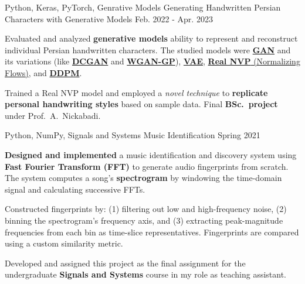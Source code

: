\begin{cventries}
  \cventry
    {Python, Keras, PyTorch, Genrative Models} %
    {Generating Handwritten Persian Characters with Generative Models} %
    {} %
    {Feb. 2022 - Apr. 2023} %
    {
      \begin{cvitems} %
      	\item {Evaluated and analyzed  \textbf{generative models} ability to represent and reconstruct individual Persian handwritten characters. The studied models were \href{https://arxiv.org/abs/1406.2661}{\textbf{GAN}} and its variations (like \href{https://arxiv.org/abs/1511.06434}{\textbf{DCGAN}} and \href{https://arxiv.org/abs/1704.00028}{\textbf{WGAN-GP}}), \href{https://arxiv.org/abs/1312.6114}{\textbf{VAE}}, \href{https://arxiv.org/abs/1605.08803}{\textbf{Real NVP} (Normalizing Flows)}, and \href{https://arxiv.org/abs/2006.11239}{\textbf{DDPM}}.}
      	\item{Trained a Real NVP model and employed a \textit{novel technique} to \textbf{replicate personal handwriting styles} based on sample data. Final \textbf{BSc.~project} under Prof.~A.~Nickabadi.}
      \end{cvitems}
    }


  \cventry
    {Python, NumPy, Signals and Systems} %
    {Music Identification} %
    {} %
    {Spring 2021} %
    {
      \begin{cvitems} %
      	\item {\textbf{Designed and implemented} a music identification and discovery system using \textbf{Fast Fourier Transform (FFT)} to generate audio fingerprints from scratch. The system computes a song's \textbf{spectrogram} by windowing the time-domain signal and calculating successive FFTs.}
        \item {Constructed fingerprints by: (1) filtering out low and high-frequency noise, (2) binning the spectrogram's frequency axis, and (3) extracting peak-magnitude frequencies from each bin as time-slice representatives. Fingerprints are compared using a custom similarity metric.}
        \item {Developed and assigned this project as the final assignment for the undergraduate \textbf{Signals and Systems} course in my role as teaching assistant.}
      \end{cvitems}
    }


\end{cventries}
